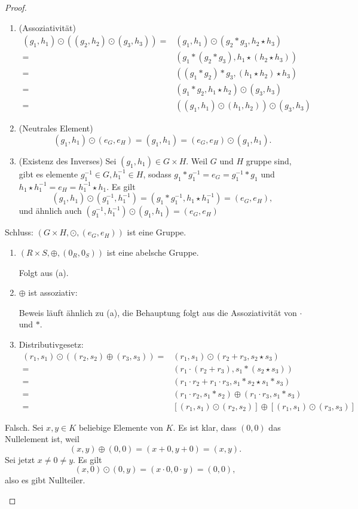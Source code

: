 \begin{proof}
	\begin{parts}
	\item 
		\begin{enumerate}[label=(\roman*)]
			\item (Assoziativität) 
\begin{align*}
	(g_1,h_1)\odot ((g_2,h_2)\odot(g_3,h_3))=&(g_1,h_1)\odot(g_2*g_3,h_2\star h_3)\\
	=& (g_1*(g_2*g_3), h_1\star(h_2\star h_3))\\
	=& ((g_1*g_2)*g_3,(h_1\star h_2)\star h_3)\\ 
	=& (g_1*g_2,h_1\star h_2)\odot (g_3,h_3)\\
	=& ((g_1,h_1)\odot (h_1,h_2))\odot (g_3,h_3)
\end{align*}
\item (Neutrales Element)
	\[
		(g_1,h_1)\odot (e_G,e_H)=(g_1,h_1)=(e_G,e_H)\odot (g_1,h_1)
	.\] 
\item (Existenz des Inverses) Sei $(g_1,h_1)\in G\times H$. Weil $G$ und $H$ gruppe sind, gibt es elemente $g_1^{-1}\in G, h_1^{-1}\in H$, sodass $g_1*g_1^{-1}=e_G=g_1^{-1}*g_1$ und $h_1\star h_1^{-1}=e_H=h_1^{-1}\star h_1$. Es gilt
	\[
		(g_1,h_1)\odot(g_1^{-1},h_1^{-1})=(g_1*g_1^{-1},h_1\star h_1^{-1})=(e_G,e_H)
	,\]
	und ähnlich auch $(g_1^{-1},h_1^{-1})\odot (g_1,h_1)=(e_G,e_H)$
		\end{enumerate}
		Schluss: $ (G\times H, \odot, (e_G,e_H))$ ist eine Gruppe.
	\item 
		\begin{enumerate}[label=(\roman*)]
			\item $(R\times S,\oplus, (0_R, 0_S))$ ist eine abelsche Gruppe.

				Folgt aus (a).
\item $\oplus$ ist assoziativ:

	Beweis läuft ähnlich zu (a), die Behauptung folgt aus die Assoziativität von $\cdot$ und $*$.
\item Distributivgesetz:
	 \begin{align*}
		 (r_1,s_1)\odot\left( (r_2,s_2)\oplus(r_3,s_3) \right) =& (r_1,s_1)\odot(r_2+r_3,s_2\star s_3)\\
		 =&(r_1\cdot (r_2+r_3),s_1*(s_2\star s_3))\\
		 =&(r_1\cdot r_2+r_1\cdot r_3, s_1*s_2\star s_1*s_3)\\
		 =&(r_1\cdot r_2, s_1*s_2)\oplus (r_1\cdot r_3, s_1*s_3)\\
		 =&\left[(r_1,s_1)\odot(r_2,s_2)\right]\oplus \left[ (r_1,s_1)\odot (r_3,s_3) \right] 
	\end{align*}
		\end{enumerate}
	\item Falsch. Sei $x,y\in K$ beliebige Elemente von $K$. Es ist klar, dass $(0,0)$ das Nullelement ist, weil
		\[
			(x,y)\oplus(0,0)=(x+0,y+0)=(x,y)
		.\] 
		Sei jetzt $x\neq 0 \neq y$. Es gilt
		\[
			(x,0)\odot (0,y)=(x\cdot 0, 0 \cdot y)=(0,0)
		,\] 
		also es gibt Nullteiler.\qedhere
	\end{parts}
\end{proof}
